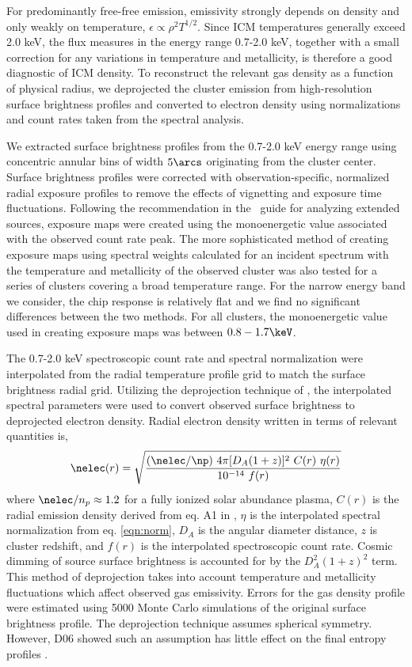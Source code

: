 \documentclass{emulateapj}
\begin{document}
For predominantly free-free emission, emissivity strongly depends on
density and only weakly on temperature, $\epsilon \propto \rho^2
T^{1/2}$. Since ICM temperatures generally exceed 2.0 keV, the flux
measures in the energy range 0.7-2.0 keV, together with a small
correction for any variations in temperature and metallicity, is
therefore a good diagnostic of ICM density. To reconstruct the
relevant gas density as a function of physical radius, we deprojected
the cluster emission from high-resolution surface brightness profiles
and converted to electron density using normalizations and count rates
taken from the spectral analysis.

We extracted surface brightness profiles from the 0.7-2.0 keV energy
range using concentric annular bins of width $5\arcs$ originating from
the cluster center. Surface brightness profiles were corrected with
observation-specific, normalized radial exposure profiles to remove
the effects of vignetting and exposure time fluctuations. Following
the recommendation in the \ciao\ guide for analyzing extended sources,
exposure maps were created using the monoenergetic value associated
with the observed count rate peak. The more sophisticated method of
creating exposure maps using spectral weights calculated for an
incident spectrum with the temperature and metallicity of the observed
cluster was also tested for a series of clusters covering a broad
temperature range. For the narrow energy band we consider, the chip
response is relatively flat and we find no significant differences
between the two methods. For all clusters, the monoenergetic value
used in creating exposure maps was between $0.8-1.7\keV$.

The 0.7-2.0 keV spectroscopic count rate and spectral normalization
were interpolated from the radial temperature profile grid to match
the surface brightness radial grid. Utilizing the deprojection
technique of \citet{kriss83}, the interpolated spectral parameters were
used to convert observed surface brightness to deprojected electron
density. Radial electron density written in terms of relevant
quantities is,
\begin{equation}
\nelec(r) = \sqrt{\frac{(\nelec/\np)~4 \pi [D_A(1+z)]^2~C(r)~\eta(r)}{10^{-14}~f(r)}}
\end{equation}
where $\nelec/n_p \approx 1.2$ for a fully ionized solar abundance
plasma, $C(r)$ is the radial emission density derived from eq. A1 in
\citet{kriss83}, $\eta$ is the interpolated spectral normalization
from eq. \ref{eqn:norm}, $D_A$ is the angular diameter distance, $z$
is cluster redshift, and $f(r)$ is the interpolated spectroscopic
count rate. Cosmic dimming of source surface brightness is accounted
for by the $D_A^2 (1+z)^2$ term. This method of deprojection takes
into account temperature and metallicity fluctuations which affect
observed gas emissivity. Errors for the gas density profile were
estimated using 5000 Monte Carlo simulations of the original surface
brightness profile. The \citet{kriss83} deprojection technique assumes
spherical symmetry. However, D06 showed such an assumption has little
effect on the final entropy profiles \citep[see also][for the low
impact of spherical symmetry assumptions for deriving density
profiles]{2003ApJ...598..190D, 2005MNRAS.359.1481B}.
\end{document}
